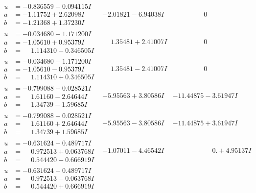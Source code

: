 \documentclass[1p]{elsarticle_modified}
\theoremstyle{definition}
\begin{document}
$$\begin{array}{c|c|c}
\begin{aligned}
u &= -0.836559 - 0.094115 I \\
a &= -1.11752 + 2.62098 I \\
b &= -1.21368 + 1.37230 I\end{aligned}
 & -2.01821 - 6.94038 I & \phantom{-0.000000 } 0 \\ \hline\begin{aligned}
u &= -0.034680 + 1.171200 I \\
a &= -1.05610 + 0.95379 I \\
b &= \phantom{-}1.114310 - 0.346505 I\end{aligned}
 & \phantom{-}1.35481 + 2.41007 I & \phantom{-0.000000 } 0 \\ \hline\begin{aligned}
u &= -0.034680 - 1.171200 I \\
a &= -1.05610 - 0.95379 I \\
b &= \phantom{-}1.114310 + 0.346505 I\end{aligned}
 & \phantom{-}1.35481 - 2.41007 I & \phantom{-0.000000 } 0 \\ \hline\begin{aligned}
u &= -0.799088 + 0.028521 I \\
a &= \phantom{-}1.61160 - 2.64644 I \\
b &= \phantom{-}1.34739 - 1.59685 I\end{aligned}
 & -5.95563 + 3.80586 I & -11.44875 - 3.61947 I \\ \hline\begin{aligned}
u &= -0.799088 - 0.028521 I \\
a &= \phantom{-}1.61160 + 2.64644 I \\
b &= \phantom{-}1.34739 + 1.59685 I\end{aligned}
 & -5.95563 - 3.80586 I & -11.44875 + 3.61947 I \\ \hline\begin{aligned}
u &= -0.631624 + 0.489717 I \\
a &= \phantom{-}0.972513 + 0.063768 I \\
b &= \phantom{-}0.544420 - 0.666919 I\end{aligned}
 & -1.07011 - 4.46542 I & \phantom{-0.000000 -}0. + 4.95137 I \\ \hline\begin{aligned}
u &= -0.631624 - 0.489717 I \\
a &= \phantom{-}0.972513 - 0.063768 I \\
b &= \phantom{-}0.544420 + 0.666919 I\end{aligned}

\end{array}$$
\end{document}
